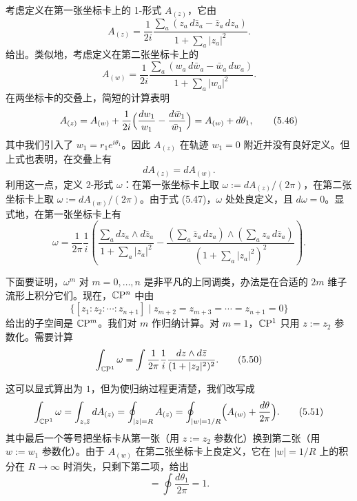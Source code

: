 考虑定义在第一张坐标卡上的 1-形式 $A_{(z)}$，它由
\begin{equation}
  A_{(z)}=\frac{1}{2i}\frac{\sum_a(z_a\,d\bar z_a-\bar z_a\,dz_a)}{1+\sum_a|z_a|^2}.
  \tag{5.44}
\end{equation}
给出。类似地，考虑定义在第二张坐标卡上的
\begin{equation}
  A_{(w)}=\frac{1}{2i}\frac{\sum_a(w_a\,d\bar w_a-\bar w_a\,dw_a)}{1+\sum_a|w_a|^2}.
  \tag{5.45}
\end{equation}
在两坐标卡的交叠上，简短的计算表明
\begin{equation}
  A_{(z)}=A_{(w)}+\frac{1}{2i}\Bigl(\frac{dw_1}{w_1}-\frac{d\bar w_1}{\bar w_1}\Bigr)=A_{(w)}+d\theta_1,
  \tag{5.46}
\end{equation}
其中我们引入了 $w_1=r_1e^{i\theta_1}$。因此 $A_{(z)}$ 在轨迹 $w_1=0$ 附近并没有良好定义。但上式也表明，在交叠上有
\begin{equation}
  dA_{(z)}=dA_{(w)}.
  \tag{5.47}
\end{equation}
利用这一点，定义 2-形式 $\omega$：在第一张坐标卡上取 $\omega:=dA_{(z)}/(2\pi)$，在第二张坐标卡上取 $\omega:=dA_{(w)}/(2\pi)$。由于式 (5.47)，$\omega$ 处处良定义，且 $d\omega=0$。显式地，在第一张坐标卡上有
\begin{equation}
  \omega=\frac{1}{2\pi}\frac{1}{i}\left(
  \frac{\sum_a dz_a\wedge d\bar z_a}{1+\sum_a|z_a|^2}
  -\frac{(\sum_a\bar z_a\,dz_a)\wedge(\sum_a z_a\,d\bar z_a)}{(1+\sum_a|z_a|^2)^2}
  \right).
  \tag{5.48}
\end{equation}

下面要证明，$\omega^m$ 对 $m=0,\dots,n$ 是非平凡的上同调类，办法是在合适的 $2m$ 维子流形上积分它们。现在，$\mathbb{C}\mathrm{P}^n$ 中由
\begin{equation}
  \{[z_1:z_2:\cdots:z_{n+1}]\mid z_{m+2}=z_{m+3}=\cdots=z_{n+1}=0\}
  \tag{5.49}
\end{equation}
给出的子空间是 $\mathbb{C}\mathrm{P}^m$。我们对 $m$ 作归纳计算。对 $m=1$，$\mathbb{C}\mathrm{P}^1$ 只用 $z:=z_2$ 参数化。需要计算
\begin{equation}
  \int_{\mathbb{C}\mathrm{P}^1}\omega=\int\frac{1}{2\pi}\frac{1}{i}\frac{dz\wedge d\bar z}{(1+|z_2|^2)^2}.
  \tag{5.50}
\end{equation}

这可以显式算出为 $1$，但为使归纳过程更清楚，我们改写成
\begin{equation}
  \int_{\mathbb{C}\mathrm{P}^1}\omega=\int_{z,\bar z}dA_{(z)}=\oint_{|z|=R}A_{(z)}
  =\oint_{|w|=1/R}\Bigl(A_{(w)}+\frac{d\theta}{2\pi}\Bigr).
  \tag{5.51}
\end{equation}
其中最后一个等号把坐标卡从第一张（用 $z:=z_2$ 参数化）换到第二张（用 $w:=w_1$ 参数化）。由于 $A_{(w)}$ 在第二张坐标卡上良定义，它在 $|w|=1/R$ 上的积分在 $R\to\infty$ 时消失，只剩下第二项，给出
\begin{equation}
  =\oint\frac{d\theta_1}{2\pi}=1.
  \tag{5.52}
\end{equation}

